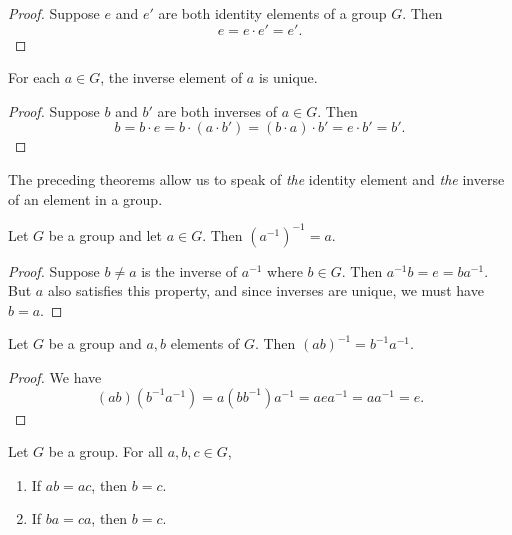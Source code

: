 \begin{proof}
    Suppose \(e\) and \(e'\) are both identity elements of a group \(G\). Then
    \[
        e = e \cdot e' = e'.
    \]
\end{proof}

\begin{theorem}
    For each \(a \in G\), the inverse element of \(a\) is unique.
\end{theorem}

\begin{proof}
    Suppose \(b\) and \(b'\) are both inverses of \(a \in G\). Then
    \[
        b = b \cdot e = b \cdot (a \cdot b') = (b \cdot a) \cdot b' = e \cdot b' = b'.
    \]
\end{proof}

\begin{remark}
    The preceding theorems allow us to speak of \emph{the} identity element and
    \emph{the} inverse of an element in a group.
\end{remark}

\begin{theorem}
    Let \(G\) be a group and let \(a \in G\). Then \((a^{-1})^{-1} = a\).
\end{theorem}

\begin{proof}
    Suppose \(b \neq a\) is the inverse of \(a^{-1}\) where \(b \in G\). Then
    \(a^{-1}b = e = ba^{-1}\). But \(a\) also satisfies this property, and since
    inverses are unique, we must have \(b = a\).
\end{proof}

\begin{theorem}
    Let \(G\) be a group and \(a, b\) elements of \(G\). Then \((ab)^{-1} =
    b^{-1}a^{-1}\).
\end{theorem}

\begin{proof}
    We have
    \[
        (ab)(b^{-1}a^{-1}) = a(bb^{-1})a^{-1} = aea^{-1} = aa^{-1} = e.
    \]
\end{proof}

\begin{theorem}
    Let \(G\) be a group. For all \(a, b, c \in G\),
    \begin{enumerate}
        \item If \(ab = ac\), then \(b = c\).
        \item If \(ba = ca\), then \(b = c\).
    \end{enumerate}
\end{theorem}

